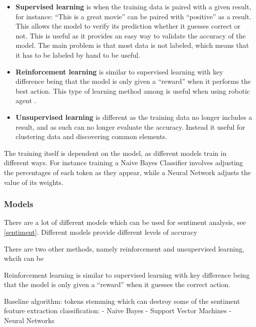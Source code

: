 \begin{itemize}
  \item \textbf{Supervised learning} is when the training data is paired with a
  given result, for instance: ``This is a great movie'' can be paired with
  ``positive'' as a result. This allows the model to verify its prediction
  whether it guesses correct or not. This is useful as it provides an easy way
  to validate the accuracy of the model. The main problem is that most data is
  not labeled, which means that it has to be labeled by hand to be
  useful.
  \item \textbf{Reinforcement learning} is similar to supervised learning with
  key difference being that the model is only given a ``reward'' when it
  performs the best action. This type of learning method among is useful when
  using robotic agent \citep{Reinforcement}.
  \item \textbf{Unsupervised learning} is different as the training data no
  longer includes a result, and as such can no longer evaluate the accuracy.
  Instead it useful for clustering data and discovering common elements.
\end{itemize}

The training itself is dependent on the model, as different models train in
different ways. For instance training a Naive Bayes Classifier involves
adjusting the percentages of each token as they appear, while a Neural Network
adjusts the value of its weights. 

\subsubsection{Models}

There are a lot of different models which can be used for sentiment analysis,
see \autoref{sentiment}. Different models provide different levels of accuracy




There are two other methods, namely reinforcement and unsupervised learning,
whcih can be 

Reinforcement learning is similar to supervised learning with key difference
being that the model is only given a ``reward'' when it guesses the correct
action. 




Baseline algorithm:
tokens
stemming which can destroy some of the sentiment
feature extraction
classification:
- Naive Bayes
- Support Vector Machines
- Neural Networks

